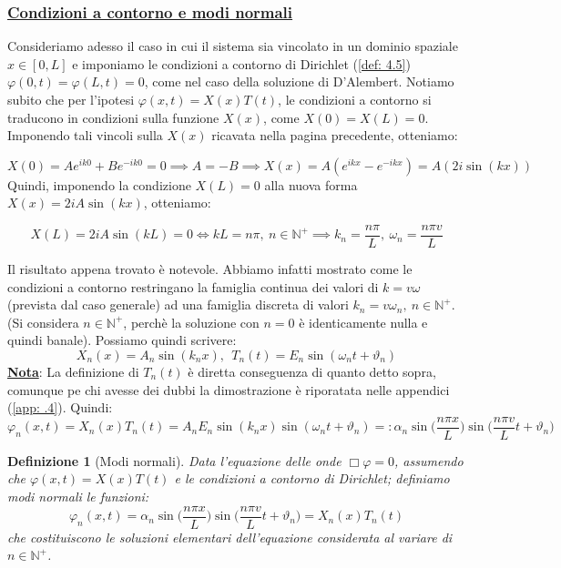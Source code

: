\documentclass[a4paper,12pt]{report}
\newtheorem{definizione}{Definizione}[chapter]
\begin{document}
\subsubsection{\underline{Condizioni a contorno e modi normali}}

Consideriamo adesso il caso in cui il sistema sia vincolato in un dominio spaziale $x\in [0,L]$ e imponiamo le condizioni a contorno di Dirichlet (\ref{def: 4.5}) $\varphi(0,t)=\varphi(L,t)=0$, come nel caso della soluzione di D'Alembert. Notiamo subito che per l'ipotesi $\varphi(x,t)=X(x)T(t)$, le condizioni a contorno si traducono in condizioni sulla funzione $X(x)$, come $X(0)=X(L)=0$. Imponendo tali vincoli sulla $X(x)$ ricavata nella pagina precedente, otteniamo: 

\[X(0)=Ae^{ik0}+Be^{-ik0}=0\implies A=-B\implies X(x)=A(e^{ikx}-e^{-ikx})=A(2i\sin(kx))\]
Quindi, imponendo la condizione $X(L)=0$ alla nuova forma $X(x)=2iA\sin(kx)$, otteniamo:

\[X(L)=2iA\sin(kL)=0\iff kL=n\pi, \ n\in \mathbb{N}^+\implies k_n=\frac{n\pi}{L}, \ \omega_n=\frac{n\pi v}{L}\]

Il risultato appena trovato è notevole. Abbiamo infatti mostrato come le condizioni a contorno restringano la famiglia continua dei valori di $k=v\omega$ (prevista dal caso generale) ad una famiglia discreta di valori $k_n=v\omega_n, \ n\in \mathbb{N}^+$. (Si considera $n\in \mathbb{N}^+$, perchè la soluzione con $n=0$ è identicamente nulla e quindi banale). Possiamo quindi scrivere:
\[X_n(x)=A_n\sin(k_nx), \ \ T_n(t)=E_n\sin(\omega_nt+\vartheta_n)\]
\underline{\textbf{Nota}}: La definizione di $T_n(t)$ è diretta conseguenza di quanto detto sopra, comunque pe chi avesse dei dubbi la dimostrazione è riporatata nelle appendici (\ref{app: .4}). Quindi:
\\
 \[\varphi_n(x,t)=X_n(x)T_n(t)=A_nE_n\sin(k_nx)\sin(\omega_nt+\vartheta_n)=:\alpha_n\sin\bigg(\displaystyle\frac{n\pi x}{L}\bigg)\sin\bigg(\frac{n\pi v}{L}t+\vartheta_n\bigg)\]

\begin{definizione}[Modi normali]
    Data l'equazione delle onde $\Box\varphi=0$, assumendo che $\varphi(x,t)=X(x)T(t)$ e le condizioni a contorno di Dirichlet; definiamo modi normali le funzioni:
    \[\varphi_n(x,t)=\alpha_n\sin\bigg(\displaystyle\frac{n\pi x}{L}\bigg)\sin\bigg(\frac{n\pi v}{L}t+\vartheta_n\bigg)=X_n(x)T_n(t)\]
    che costituiscono le soluzioni elementari dell'equazione considerata al variare di $n\in \mathbb{N}^+$.
\end{definizione}
\end{document}
